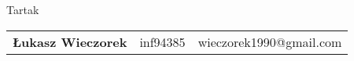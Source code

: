\thispagestyle{empty}
\begin{center}
{\LARGE{Tartak\\}}
\vspace{3ex}
\begin{tabular}{llr}
\textbf{Łukasz Wieczorek} & inf94385 & wieczorek1990@gmail.com\\
\end{tabular}
\end{center}